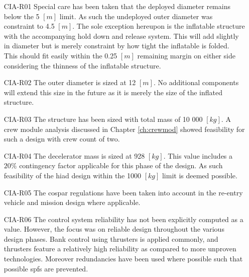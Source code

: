 \begin{itemize}[leftmargin=+20mm]
\item[CIA-R01] Special care has been taken that the deployed diameter remains below the 5 $[m]$ limit. As such the undeployed outer diameter was constraint to 4.5 $[m]$. The sole exception hereupon is the inflatable structure with the accompanying hold down and release system. This will add slightly in diameter but is merely constraint by how tight the inflatable is folded. This should fit easily within the 0.25 $[m]$ remaining margin on either side considering the thinness of the inflatable structure. 
\item[CIA-R02] The outer diameter is sized at 12 $[m]$. No additional components will extend this size in the future as it is merely the size of the inflated structure.
\item[CIA-R03] The structure has been sized with total mass of 10 000 $[kg]$. A crew module analysis discussed in Chapter \ref{ch:crewmod} showed feasibility for such a design with crew count of two.
\item[CIA-R04] The decelerator mass is sized at 928 $[kg]$. This value includes a $20\%$ contingency factor applicable for this phase of the design. As such feasibility of the \gls{hiad} design within the 1000 $[kg]$ limit is deemed possible.
\item[CIA-R05] The \gls{cospar} regulations have been taken into account in the re-entry vehicle and mission design where applicable.
\item[CIA-R06] The control system reliability has not been explicitly computed as a value. However, the focus was on reliable design throughout the various design phases. Bank control using thrusters is applied commonly, and thrusters feature a relatively high reliability as compared to more unproven technologies. Moreover redundancies have been used where possible such that possible \glspl{spf} are prevented. 
\end{itemize}


